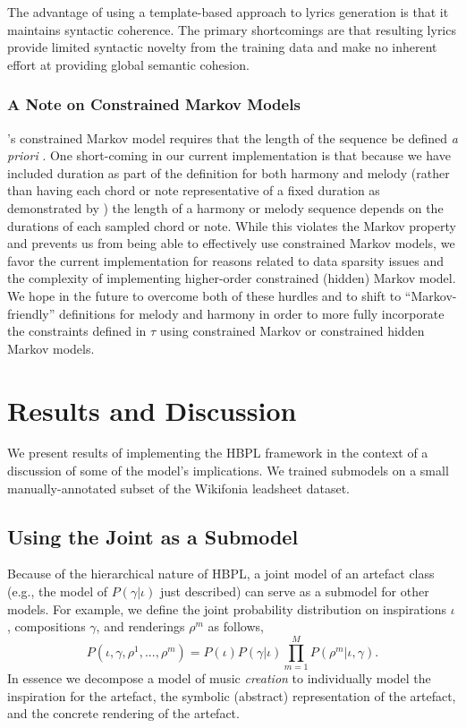 \documentclass[phd,electronic,oneside,twosidetoc,letterpaper,chaptercenter,parttop,lol,lof,lot]{byumsphd}
\begin{document}
The advantage of using a template-based approach to lyrics generation is that it maintains syntactic coherence. The primary shortcomings are that resulting lyrics provide limited syntactic novelty from the training data and make no inherent effort at providing global semantic cohesion.

\subsubsection{A Note on Constrained Markov Models}

\citeauthor{pachet2011finite}'s constrained Markov model requires that the length of the sequence be defined \emph{a priori} \cite{pachet2011finite}. One short-coming in our current implementation is that because we have included duration as part of the definition for both harmony and melody (rather than having each chord or note representative of a fixed duration as demonstrated by \citeauthor{pachet2014imitative} \cite{pachet2014imitative}) the length of a harmony or melody sequence depends on the durations of each sampled chord or note. While this violates the Markov property and prevents us from being able to effectively use constrained Markov models, we favor the current implementation for reasons related to data sparsity issues and the complexity of implementing higher-order constrained (hidden) Markov model. We hope in the future to overcome both of these hurdles and to shift to ``Markov-friendly'' definitions for melody and harmony in order to more fully incorporate the constraints defined in $\tau$ using constrained Markov or constrained hidden Markov models.

\section{Results and Discussion}

We present results of implementing the HBPL framework in the context of a discussion of some of the model's implications. We trained submodels on a small manually-annotated subset of the Wikifonia leadsheet dataset.

\subsection{Using the Joint as a Submodel}

Because of the hierarchical nature of HBPL, a joint model of an artefact class (e.g., the model of $P(\gamma|\iota)$ just described) can serve as a submodel for other models. For example, we define the joint probability distribution on inspirations $\iota$, compositions $\gamma$, and renderings $\rho^{m}$ as follows,
\[ P(\iota,\gamma,\rho^1, ..., \rho^m) = P(\iota)P(\gamma|\iota) \prod_{m=1}^M P(\rho^m|\iota,\gamma). \]
In essence we decompose a model of music \emph{creation} to individually model the inspiration for the artefact, the symbolic (abstract) representation of the artefact, and the concrete rendering of the artefact. 
\end{document}

